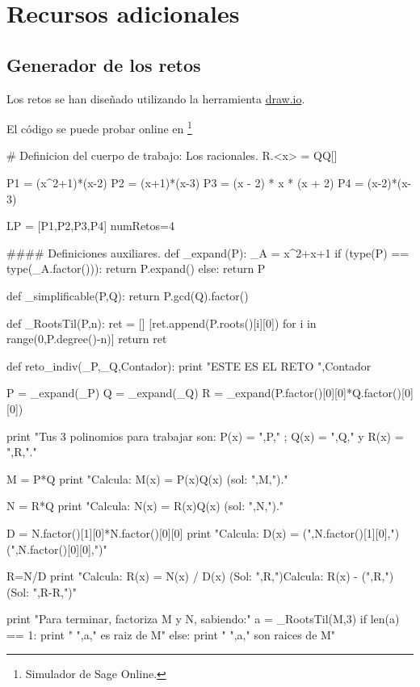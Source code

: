 
\chapter{Recursos adicionales}

\section{Generador de los retos}

Los retos se han diseñado utilizando la herramienta \url{draw.io}.


El código se puede probar online en  \footnote{Simulador de Sage Online.}


\begin{python}
# Definicion del cuerpo de trabajo: Los racionales.
R.<x> = QQ[]

P1 = (x^2+1)*(x-2)
P2 = (x+1)*(x-3)
P3 = (x - 2) * x * (x + 2)
P4 = (x-2)*(x-3)

LP = [P1,P2,P3,P4]
numRetos=4

#### Definiciones auxiliares.
def _expand(P):
    _A = x^2+x+1
    if (type(P) == type(_A.factor())):
        return P.expand()
    else:
        return P

def _simplificable(P,Q):
    return P.gcd(Q).factor()

def _RootsTil(P,n):
    ret = []
    [ret.append(P.roots()[i][0]) for i in range(0,P.degree()-n)]
    return ret

def reto_indiv(_P,_Q,Contador):
    print "ESTE ES EL RETO ",Contador
    
    P = _expand(_P)
    Q = _expand(_Q)
    R = _expand(P.factor()[0][0]*Q.factor()[0][0])
    
    print "Tus 3 polinomios para trabajar son: P(x) = ",P," ; Q(x) = ",Q," y R(x) = ",R,".\n"
    
    M = P*Q
    print "Calcula: M(x) = P(x)Q(x) (sol: ",M,")."

    N = R*Q
    print "Calcula: N(x) = R(x)Q(x) (sol: ",N,")."

    D = N.factor()[1][0]*N.factor()[0][0]
    print "Calcula: D(x) = (",N.factor()[1][0],")(",N.factor()[0][0],")"

    R=N/D
    print "Calcula: R(x) = N(x) / D(x) (Sol: ",R,")\n Calcula: R(x) - (",R,") (Sol: ",R-R,")"

    
    print "Para terminar, factoriza M y N, sabiendo:"
    a = _RootsTil(M,3)
    if len(a) == 1:
        print "    ",a," es raiz de M"
    else:
        print "    ",a," son raices de M"
    

\end{python}
